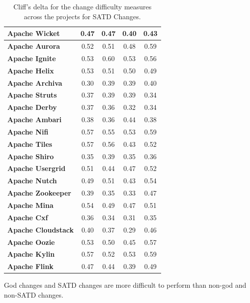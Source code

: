 {\begin{landscape}
\begin{table}[!htbp]
\begin{tabular}{l|c|c|c|c}
			\textbf{Apache Wicket} & 0.47 & 0.47 & 0.40 & 0.43
\\ \hline
			\textbf{Apache Aurora} & 0.52 & 0.51 & 0.48 & 0.59
\\ \hline
			\textbf{Apache Ignite} & 0.53 & 0.60 & 0.53 & 0.56
\\ \hline
			\textbf{Apache Helix} & 0.53 & 0.51 & 0.50 & 0.49
\\ \hline
			\textbf{Apache Archiva} & 0.30 & 0.39 & 0.39 & 0.40
\\ \hline
			\textbf{Apache Struts} & 0.37 & 0.39 & 0.39 & 0.34
\\ \hline
			\textbf{Apache Derby} & 0.37 & 0.36 & 0.32 & 0.34
\\ \hline
			\textbf{Apache Ambari} & 0.38 & 0.36 & 0.44 & 0.38
\\ \hline
			\textbf{Apache Nifi} & 0.57 & 0.55 & 0.53 & 0.59
\\ \hline
			\textbf{Apache Tiles} & 0.57 & 0.56 & 0.43 & 0.52
\\ \hline
			\textbf{Apache Shiro} & 0.35 & 0.39 & 0.35 & 0.36
\\ \hline
			\textbf{Apache Usergrid} & 0.51 & 0.44 & 0.47 & 0.52
\\ \hline
			\textbf{Apache Nutch} & 0.49 & 0.51 & 0.43 & 0.54
\\ \hline
			\textbf{Apache Zookeeper} & 0.39 & 0.35 & 0.33 & 0.47
\\ \hline
			\textbf{Apache Mina} & 0.54 & 0.49 & 0.47 & 0.51
\\ \hline
			\textbf{Apache Cxf} & 0.36 & 0.34 & 0.31 & 0.35 \\ \hline
			\textbf{Apache Cloudstack} & 0.40 & 0.37 & 0.29 & 0.46
\\ \hline
			\textbf{Apache Oozie} & 0.53 & 0.50 & 0.45 & 0.57
\\ \hline
			\textbf{Apache Kylin} & 0.57 & 0.52 & 0.53 & 0.59
\\ \hline
			\textbf{Apache Flink} & 0.47 & 0.44 & 0.39 & 0.49 \\ \hline
			
			
			
		\end{tabular}
		\caption{Cliff's delta for the change difficulty measures across the projects for SATD Changes.}
		\label{table:cliff_deltas_RQ4_TD}
	\end{table}
\end{landscape}

\begin{myboxii}
	God changes and SATD changes are more difficult to perform than non-god and non-SATD changes.
\end{myboxii}

}
